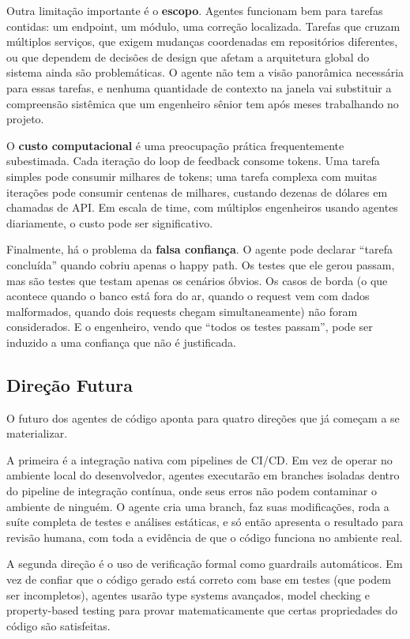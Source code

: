 Outra limitação importante é o \textbf{escopo}. Agentes funcionam bem para tarefas
contidas: um endpoint, um módulo, uma correção localizada. Tarefas que cruzam
múltiplos serviços, que exigem mudanças coordenadas em repositórios diferentes, ou
que dependem de decisões de design que afetam a arquitetura global do sistema ainda
são problemáticas. O agente não tem a visão panorâmica necessária para essas tarefas,
e nenhuma quantidade de contexto na janela vai substituir a compreensão sistêmica que
um engenheiro sênior tem após meses trabalhando no projeto.

O \textbf{custo computacional} é uma preocupação prática frequentemente subestimada.
Cada iteração do loop de feedback consome tokens. Uma tarefa simples pode consumir
milhares de tokens; uma tarefa complexa com muitas iterações pode consumir centenas
de milhares, custando dezenas de dólares em chamadas de API. Em escala de time, com
múltiplos engenheiros usando agentes diariamente, o custo pode ser significativo.

Finalmente, há o problema da \textbf{falsa confiança}. O agente pode declarar ``tarefa
concluída'' quando cobriu apenas o happy path. Os testes que ele gerou passam,
mas são testes que testam apenas os cenários óbvios. Os casos de borda (o que
acontece quando o banco está fora do ar, quando o request vem com dados malformados,
quando dois requests chegam simultaneamente) não foram considerados. E o engenheiro,
vendo que ``todos os testes passam'', pode ser induzido a uma confiança que não é
justificada.

\subsection{Direção Futura}

O futuro dos agentes de código aponta para quatro direções que já começam a se
materializar.

A primeira é a integração nativa com pipelines de CI/CD. Em vez de operar no ambiente
local do desenvolvedor, agentes executarão em branches isoladas dentro do pipeline de
integração contínua, onde seus erros não podem contaminar o ambiente de ninguém. O
agente cria uma branch, faz suas modificações, roda a suíte completa de testes e
análises estáticas, e só então apresenta o resultado para revisão humana, com toda
a evidência de que o código funciona no ambiente real.

A segunda direção é o uso de verificação formal como guardrails automáticos. Em vez de
confiar que o código gerado está correto com base em testes (que podem ser incompletos),
agentes usarão type systems avançados, model checking e property-based testing para
provar matematicamente que certas propriedades do código são satisfeitas.

